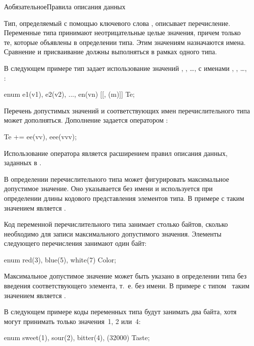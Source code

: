 \begin{appendix}{А}{обязательное}{Правила описания данных}
\label{SYNTAX.Enums}

Тип, определяемый с помощью ключевого слова , описывает 
перечисление. Переменные типа принимают неотрицательные целые значения, причем 
только те, которые объявлены в определении типа. Этим значениям назначаются 
имена. Сравнение и присваивание должны выполняться в рамках одного типа.

В следующем примере тип  задает использование значений 
, , \ldots,  с именами 
, , \ldots, :
\begin{codeblock}
enum { e1(v1), e2(v2), ..., en(vn) [[, (m)]] } Te;
\end{codeblock}

Перечень допустимых значений и соответствующих имен перечислительного типа 
может дополняться. Дополнение задается оператором \code{+=}:
\begin{codeblock}
Te += {ee(vv), eee(vvv)};
\end{codeblock}

\begin{note*}
Использование оператора \code{+=} является расширением правил описания данных, 
заданных в \cite{RFC8446}.
\end{note*}

В определении перечислительного типа может фигурировать максимальное допустимое 
значение. Оно указывается без имени и используется при определении длины 
кодового представления элементов типа. В примере с  таким значением 
является .

Код переменной перечислительного типа занимает столько байтов, сколько 
необходимо для записи максимального допустимого значения. Элементы следующего 
перечисления занимают один байт:
%
\begin{codeblock}
enum { red(3), blue(5), white(7) } Color;
\end{codeblock}

Максимальное допустимое значение может быть указано в определении типа без 
введения соответствующего элемента, т.~е. без имени. В примере с типом~ 
таким значением является . 

В следующем примере коды переменных типа  будут занимать два байта, 
хотя могут принимать только значения~1, 2 или~4: 
%
\begin{codeblock}
enum { sweet(1), sour(2), bitter(4), (32000) } Taste;
\end{codeblock}


\end{appendix}
